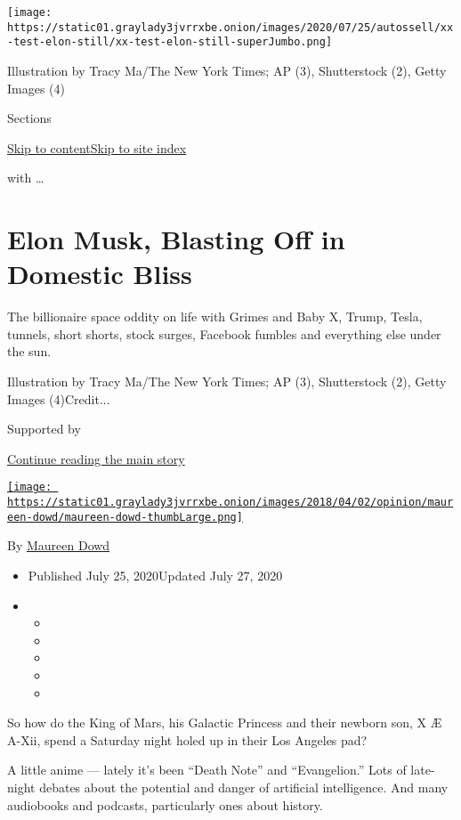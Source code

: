 \texttt{[image: https://static01.graylady3jvrrxbe.onion/images/2020/07/25/autossell/xx-test-elon-still/xx-test-elon-still-superJumbo.png]}

Illustration by Tracy Ma/The New York Times; AP (3), Shutterstock (2),
Getty Images (4)

Sections

\protect\hyperlink{site-content}{Skip to
content}\protect\hyperlink{site-index}{Skip to site index}

with \ldots{}

\hypertarget{elon-musk-blasting-off-in-domestic-bliss}{%
\section{Elon Musk, Blasting Off in Domestic
Bliss}\label{elon-musk-blasting-off-in-domestic-bliss}}

The billionaire space oddity on life with Grimes and Baby X, Trump,
Tesla, tunnels, short shorts, stock surges, Facebook fumbles and
everything else under the sun.

Illustration by Tracy Ma/The New York Times; AP (3), Shutterstock (2),
Getty Images (4)Credit...

Supported by

\protect\hyperlink{after-sponsor}{Continue reading the main story}

\href{https://www.nytimes3xbfgragh.onion/by/maureen-dowd}{\texttt{[image: https://static01.graylady3jvrrxbe.onion/images/2018/04/02/opinion/maureen-dowd/maureen-dowd-thumbLarge.png]}}

By \href{https://www.nytimes3xbfgragh.onion/by/maureen-dowd}{Maureen
Dowd}

\begin{itemize}
\item
  Published July 25, 2020Updated July 27, 2020
\item
  \begin{itemize}
  \item
  \item
  \item
  \item
  \item
  \end{itemize}
\end{itemize}

So how do the King of Mars, his Galactic Princess and their newborn son,
X Æ A-Xii, spend a Saturday night holed up in their Los Angeles pad?

A little anime --- lately it's been ``Death Note'' and ``Evangelion.''
Lots of late-night debates about the potential and danger of artificial
intelligence. And many audiobooks and podcasts, particularly ones about
history.

